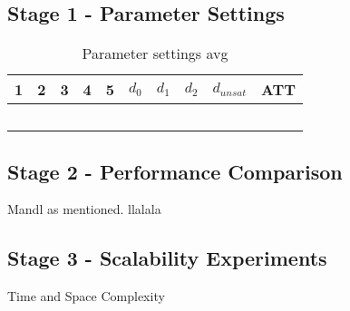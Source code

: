\subsection{Stage 1 - Parameter Settings}

\begin{table}[H]
\centering
    \begin{tabular}{|l|l|l|l|l||l|l|l|l|l|}

 	\hline
 	1 & 2 & 3 & 4 & 5 & $d_0$ & $d_1$ & $d_2$ & $d_{unsat}$ & ATT \\
 	\hline
    ~ & ~ & ~ & ~ & ~ & ~ & ~ & ~ & ~ & ~ \\

	\hline
    \end{tabular}
    \caption {Parameter settings avg}
    \label{table:parameterSettings}

\end{table}

\subsection{Stage 2 - Performance Comparison}

Mandl as mentioned. llalala

\subsection{Stage 3 -  Scalability Experiments}
Time and Space Complexity